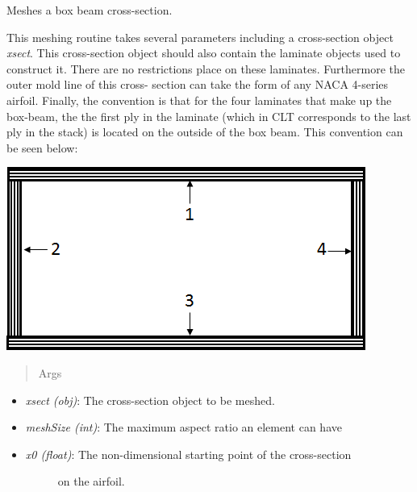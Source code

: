 \documentclass[letterpaper,10pt,english]{sphinxmanual}
\begin{document}
\begin{fulllineitems}
\begin{itemize}
\begin{description}
\end{description}

\end{itemize}

\begin{fulllineitems}
\label{structures:AeroComBAT.Structures.Mesher.boxBeam}
Meshes a box beam cross-section.

This meshing routine takes several parameters including a cross-section
object \emph{xsect}. This cross-section object should also contain the
laminate objects used to construct it. There are no restrictions place
on these laminates. Furthermore the outer mold line of this cross-
section can take the form of any NACA 4-series airfoil. Finally, the
convention is that for the four laminates that make up the box-beam,
the the first ply in the laminate (which in CLT corresponds to the last
ply in the stack) is located on the outside of the box beam. This
convention can be seen below:

{\hfill\includegraphics{boxBeamGeom.png}\hfill}
\begin{quote}\begin{description}
\item[{Args}] \leavevmode
\end{description}\end{quote}
\begin{itemize}
\item {} 
\emph{xsect (obj)}: The cross-section object to be meshed.

\item {} 
\emph{meshSize (int)}: The maximum aspect ratio an element can have

\item {} \begin{description}
\item[{\emph{x0 (float)}: The non-dimensional starting point of the cross-section}] \leavevmode
on the airfoil.


\end{description}
\end{itemize}
\end{fulllineitems}
\end{fulllineitems}
\end{document}
